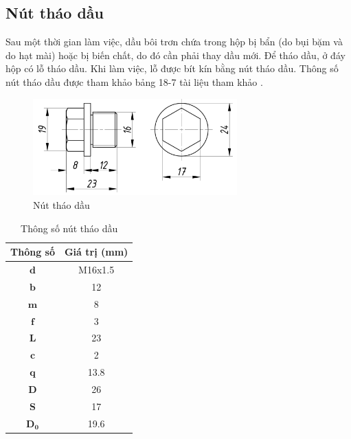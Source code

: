         \subsection{Nút tháo dầu}
            \hspace*{0.6cm}Sau một thời gian làm việc, dầu bôi trơn chứa trong hộp bị bẩn (do bụi bặm và do hạt mài) hoặc bị biến chất, do đó cần phải thay dầu mới. Để tháo dầu, ở đáy hộp có lỗ tháo dầu. Khi làm việc, lỗ được bít kín bằng nút tháo dầu. Thông số nút tháo dầu được tham khảo bảng 18-7 tài liệu tham khảo \cite{tltk2}.\\ 
            \begin{figure}[H]
                \centering
                \includegraphics[width=0.7\textwidth]{pictures/oil_drain_plug.png}
                \caption{Nút tháo dầu}
                \label{oil_drain_plug}
            \end{figure}
            \begin{table}[H]
                \centering
                \begin{tabular}{|c|c|}
                    \hline
                    \textbf{Thông số} & \textbf{Giá trị (mm)} \\
                    \hline
                    $\mathbf{d}$ & M16x1.5 \\     
                    \hline
                    $\mathbf{b}$ & 12 \\
                    \hline
                    $\mathbf{m}$ & 8 \\
                    \hline
                    $\mathbf{f}$ & 3 \\
                    \hline
                    $\mathbf{L}$ & 23 \\
                    \hline
                    $\mathbf{c}$ & 2 \\
                    \hline
                    $\mathbf{q}$ & 13.8 \\
                    \hline
                    $\mathbf{D}$ & 26 \\
                    \hline
                    $\mathbf{S}$ & 17 \\
                    \hline
                    $\mathbf{D_{0}}$ & 19.6 \\
                    \hline
                \end{tabular}     
                \caption{Thông số nút tháo dầu}
            \end{table}
